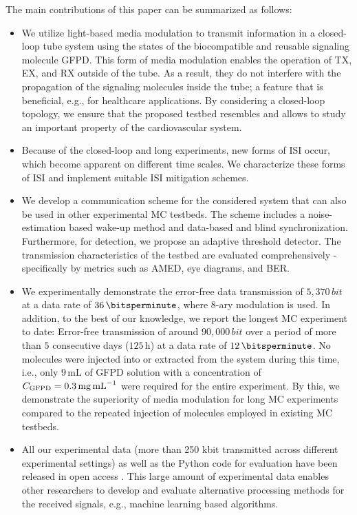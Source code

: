 The main contributions of this paper can be summarized as follows:
\begin{itemize}
    \item We utilize light-based media modulation to transmit information in a closed-loop tube system using the states of the biocompatible and reusable signaling molecule \ac{GFPD}. This form of media modulation enables the operation of \ac{TX}, \ac{EX}, and \ac{RX} outside of the tube. As a result, they do not interfere with the propagation of the signaling molecules inside the tube; a feature that is beneficial, e.g., for healthcare applications. By considering a closed-loop topology, we ensure that the proposed testbed resembles and allows to study an important property of the cardiovascular system.
    \item Because of the closed-loop and long experiments, new forms of \ac{ISI} occur, which become apparent on different time scales. We characterize these forms of \ac{ISI} and implement suitable \ac{ISI} mitigation schemes. 
    \item We develop a communication scheme for the considered system that can also be used in other experimental \ac{MC} testbeds. The scheme includes a noise-estimation based wake-up method and data-based and blind synchronization. Furthermore, for detection, we propose an adaptive threshold detector. The transmission characteristics of the testbed are evaluated comprehensively - specifically by metrics such as \ac{AMED}, eye diagrams, and \ac{BER}.
    \item We experimentally demonstrate the error-free data transmission of $5,370 \, \si{bit}$ at a data rate of $36 \, \si{\bitsperminute}$, where 8-ary modulation is used. In addition, to the best of our knowledge, we report the longest MC experiment to date: Error-free transmission of around $90,000 \, \si{bit}$ over a period of more than $5$ consecutive days ($125 \, \si{\hour}$) at a data rate of $12 \, \si{\bitsperminute}$. No molecules were injected into or extracted from the system during this time, i.e., only $9 \, \si{\milli \liter}$ of \ac{GFPD} solution with a concentration of $C_{\mathrm{GFPD}} = 0.3 \,\si{\milli\gram \per\milli\liter}$ were required for the entire experiment. By this, we  demonstrate the superiority of media modulation for long \ac{MC} experiments compared to the repeated injection of molecules employed in existing \ac{MC} testbeds.
    \item All our experimental data (more than 250 kbit transmitted across different experimental settings) as well as the Python code for evaluation have been released in open access \cite{scherer2025Zenodo}. This large amount of experimental data enables other researchers to develop and evaluate alternative processing methods for the received signals, e.g., machine learning based algorithms.
\end{itemize}
